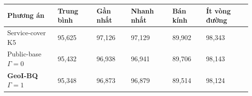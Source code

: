 \par\smallskip\noindent\begin{tabularx}{\linewidth}{@{}P{4.3cm}XXXXX@{}}\toprule
\textbf{Phương án} & \textbf{Trung bình} & \textbf{Gần nhất} & \textbf{Nhanh nhất} & \textbf{Bán kính} & \textbf{Ít vòng đường} \\
\midrule
Service-cover K5 & 95{,}625 & 97{,}126 & 97{,}129 & 89{,}902 & 98{,}343 \\
Public-base $\Gamma=0$ & 95{,}432 & 96{,}938 & 96{,}941 & 89{,}706 & 98{,}143 \\
\textbf{GeoI-BQ $\Gamma=1$} & 95{,}348 & 96{,}873 & 96{,}879 & 89{,}514 & 98{,}124 \\
\bottomrule\end{tabularx}\par\smallskip
